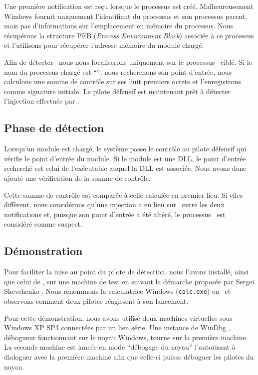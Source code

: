 Une première notification est reçu lorsque le processus est créé.
Malheureusement Windows fournit uniquement l'identifiant du processus et son processus parent, mais pas d'informations sur l'emplacement en mémoire du processus.
Nous récupérons la structure PEB (\emph{Process Environment Block}) associée à ce processus et l'utilisons pour récupérer l'adresse mémoire du module chargé.

Afin de détecter \duqu\ nous nous focaliserons uniquement sur le processus \services\ ciblé.
Si le nom du processus chargé est ``\services '', nous recherchons son point d'entrée, nous calculons une somme de contrôle sur ses huit premiers octets et l'enregistrons comme signature initiale.
Le pilote défensif est maintenant prêt à détecter l'injection effectuée par \duqu.

\subsection{Phase de détection}
Lorsqu'un module est chargé, le système passe le contrôle au pilote défensif qui vérifie le point d'entrée du module.
Si le module est une DLL, le point d'entrée recherché est celui de l'exécutable auquel la DLL est associée.
Nous avons donc ajouté une vérification de la somme de contrôle.

Cette somme de contrôle est comparée à celle calculée en premier lieu.
Si elles diffèrent, nous considérons qu'une injection a eu lieu sur \services\ entre les deux notifications et, puisque son point d'entrée a été altéré, le processus \services\ est considéré comme suspect.


\subsection{Démonstration}
Pour faciliter la mise au point du pilote de détection, nous l'avons installé, ainsi que celui de \duqu, sur une machine de test en suivant la démarche proposée par Sergei Shevchenko \cite{SShevchenko}.
Nous renommons la calculatrice Windows (\texttt{calc.exe}) en \services\ et observons comment deux pilotes réagissent à son lancement.

Pour cette démonstration, nous avons utilisé deux machines virtuelles sous Windows XP SP3 connectées par un lien série.
Une instance de WinDbg \cite{WinDBG}, débogueur fonctionnant sur le noyau Windows, tourne sur la première machine.
La seconde machine est lancée en mode ``débogage du noyau'' l'autorisant à dialoguer avec la première machine afin que celle-ci puisse déboguer les pilotes du noyau.

